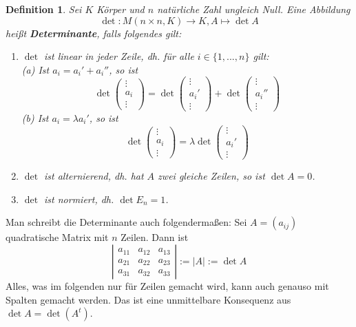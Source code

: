 \documentclass[12pt,a4paper]{article}
\theoremstyle{plain}
\newtheorem{Definition}[Theorem]{Definition}
\numberwithin{equation}{section}
\begin{document}
\begin{Definition}
Sei $K$ Körper und $n$ natürliche Zahl ungleich Null. Eine Abbildung
\[\operatorname{det}\colon M(n\times n,K)\rightarrow K, A\mapsto \operatorname{det} A\]
heißt \textbf{Determinante}, falls folgendes gilt:
\begin{enumerate}
\item $\operatorname{det}$ ist \textsl{linear} in jeder Zeile, dh. für alle $i\in\{1,...,n\}$ gilt:\\
(a) Ist $a_i=a_i'+a_i''$, so ist
\[\operatorname{det}\begin{pmatrix} \vdots\\ a_i\\\vdots\end{pmatrix}=\operatorname{det}\begin{pmatrix} \vdots\\ a_i'\\\vdots\end{pmatrix}+\operatorname{det}\begin{pmatrix} \vdots\\ a_i''\\\vdots\end{pmatrix}\]
(b) Ist $a_i=\lambda a_i'$, so ist
\[\operatorname{det}\begin{pmatrix} \vdots\\ a_i\\\vdots\end{pmatrix}=\lambda\operatorname{det}\begin{pmatrix} \vdots\\ a_i'\\\vdots\end{pmatrix}\]
\item $\operatorname{det}$ ist \textsl{alternierend}, dh. hat $A$ zwei gleiche Zeilen, so ist $\operatorname{det} A=0$.
\item $\operatorname{det}$ ist \textsl{normiert}, dh. $\operatorname{det} E_n=1$.
\end{enumerate}
\end{Definition}
Man schreibt die Determinante auch folgendermaßen: Sei $A=(a_{ij})$ quadratische Matrix mit $n$ Zeilen. Dann ist
\[\left\lvert\begin{matrix}a_{11}&a_{12}&a_{13}\\ a_{21}&a_{22}&a_{23}\\ a_{31}&a_{32}&a_{33}\end{matrix}\right\rvert :=\lvert A\rvert :=\det A\]
Alles, was im folgenden nur für Zeilen gemacht wird, kann auch genauso mit Spalten gemacht werden. Das ist eine unmittelbare Konsequenz aus $\det A=\det(A^t)$.
\end{document}
